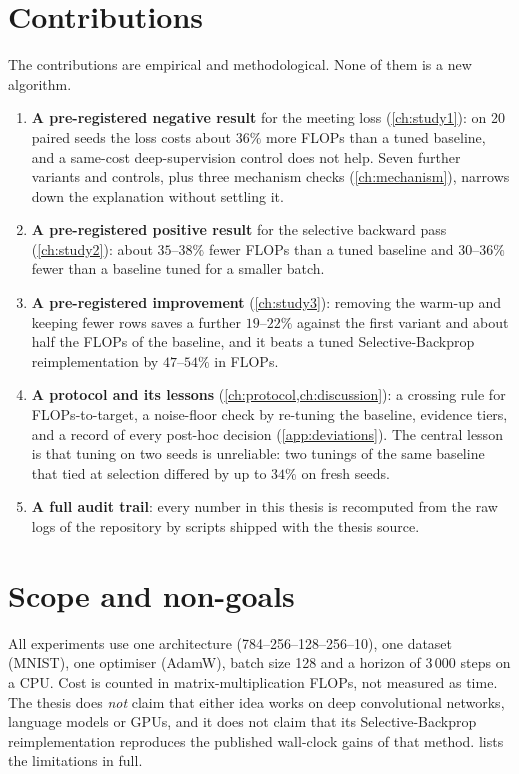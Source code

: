 \section{Contributions}
The contributions are empirical and methodological. None of them is a new algorithm.
\begin{enumerate}
\item \textbf{A pre-registered negative result} for the meeting loss (\cref{ch:study1}): on 20 paired seeds the loss costs about $36\%$ more FLOPs than a tuned baseline, and a same-cost deep-supervision control does not help. Seven further variants and controls, plus three mechanism checks (\cref{ch:mechanism}), narrows down the explanation without settling it.
\item \textbf{A pre-registered positive result} for the selective backward pass (\cref{ch:study2}): about $35$--$38\%$ fewer FLOPs than a tuned baseline and $30$--$36\%$ fewer than a baseline tuned for a smaller batch.
\item \textbf{A pre-registered improvement} (\cref{ch:study3}): removing the warm-up and keeping fewer rows saves a further $19$--$22\%$ against the first variant and about half the FLOPs of the baseline, and it beats a tuned Selective-Backprop reimplementation by $47$--$54\%$ in FLOPs.
\item \textbf{A protocol and its lessons} (\cref{ch:protocol,ch:discussion}): a crossing rule for FLOPs-to-target, a noise-floor check by re-tuning the baseline, evidence tiers, and a record of every post-hoc decision (\cref{app:deviations}). The central lesson is that tuning on two seeds is unreliable: two tunings of the same baseline that tied at selection differed by up to $34\%$ on fresh seeds.
\item \textbf{A full audit trail}: every number in this thesis is recomputed from the raw logs of the repository by scripts shipped with the thesis source.
\end{enumerate}

\section{Scope and non-goals}
All experiments use one architecture (784--256--128--256--10), one dataset (MNIST), one optimiser (AdamW), batch size 128 and a horizon of 3\,000 steps on a CPU. Cost is counted in matrix-multiplication FLOPs, not measured as time. The thesis does \emph{not} claim that either idea works on deep convolutional networks, language models or GPUs, and it does not claim that its Selective-Backprop reimplementation reproduces the published wall-clock gains of that method.  lists the limitations in full.

